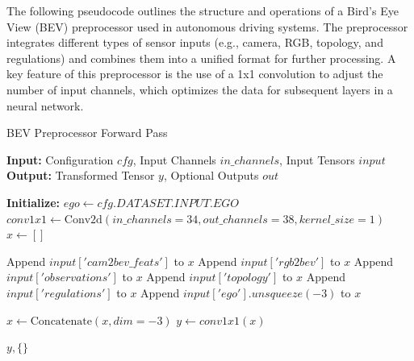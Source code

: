 The following pseudocode outlines the structure and operations of a Bird’s Eye View (BEV) preprocessor used in autonomous driving systems. The preprocessor integrates different types of sensor inputs (e.g., camera, RGB, topology, and regulations) and combines them into a unified format for further processing. A key feature of this preprocessor is the use of a 1x1 convolution to adjust the number of input channels, which optimizes the data for subsequent layers in a neural network.

\begin{algorithm}
\caption{BEV Preprocessor Forward Pass}
\begin{algorithmic}[1]
\State \textbf{Input:} Configuration $cfg$, Input Channels $in\_channels$, Input Tensors $input$
\State \textbf{Output:} Transformed Tensor $y$, Optional Outputs $out$

\State \textbf{Initialize:} 
\State \hspace{1cm} $ego \gets cfg.DATASET.INPUT.EGO$
\State \hspace{1cm} $conv1x1 \gets \text{Conv2d}(in\_channels=34, out\_channels=38, kernel\_size=1)$
\State $x \gets []$ 

    \State Append $input['cam2bev\_feats']$ to $x$
\EndIf
{}
    \State Append $input['rgb2bev']$ to $x$
\EndIf
{}
    \State Append $input['observations']$ to $x$
\EndIf
{}
    \State Append $input['topology']$ to $x$
\EndIf
{}
    \State Append $input['regulations']$ to $x$
\EndIf
{}
    \State Append $input['ego'].unsqueeze(-3)$ to $x$
\EndIf

\State $x \gets \text{Concatenate}(x, dim=-3)$ 
\State $y \gets conv1x1(x)$ 

\State \Return $y, \{\}$ 
\end{algorithmic}
\end{algorithm}



